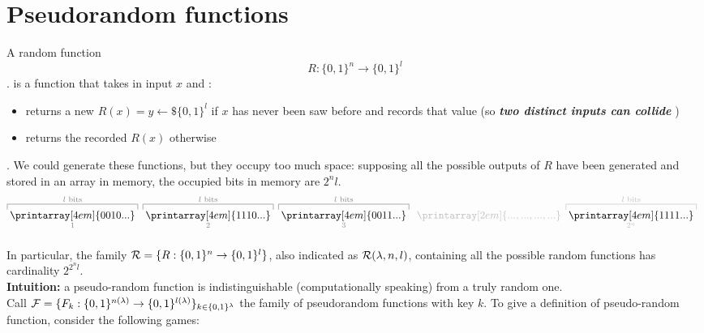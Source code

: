 \section{Pseudorandom functions}

A random function
\[  R:\{0,1\}^{n} \to \{0,1\}^{l} \].
is a function that takes in input $x$ and :
\begin{itemize}
    \item returns a new $R(x)=y \leftarrow\$ \{0,1\}^{l}$ if $x$ has never been
        saw before and records that value (so \textbf{ \textit{two distinct inputs can collide} })

    \item returns the recorded $R(x)$ otherwise
\end{itemize}.
We could generate these functions, but they occupy too much space: supposing all
the possible outputs of $R$ have been generated and stored in an array in memory, the
occupied bits in memory are $2^{n}l$.
\[  
    \color{black!50}%
    \overbracket[0.5pt][5pt]{{\thickspace}%
    \color{black}\printarray[4em]{0010...}\thickspace}^{l\textrm{ bits}}_{1}\thickspace%
    \overbracket[0.5pt][5pt]{{\thickspace}%
    \color{black}\printarray[4em]{1110...}\thickspace}^{l\textrm{ bits}}_{2}\thickspace%
    \overbracket[0.5pt][5pt]{{\thickspace}%
      \color{black}\printarray[4em]{0011...}\thickspace}^{l\textrm{ bits}}_{3}\thickspace%
    \color{black!25}\underbracket[0pt][5.5pt]{{\thickspace}%
      \printarray[2em]{...,...,...,...}\thickspace}_{}%
    \overbracket[0.5pt][5pt]{{\thickspace}%
      \color{black}\printarray[4em]{1111...}\thickspace}^{l\textrm{ bits}}_{2^{n}}\thickspace%
  \thickspace
\]

In particular, the family $\mathcal{R}=\{ R:\{0,1\}^{n} \to \{0,1\}^{l} \}$, also
indicated as $\mathcal{R}(\lambda, n, l)$,  containing
all the possible random functions has cardinality $2^{2^{n}l}$.\\

\textbf{Intuition:} a pseudo-random function is indistinguishable
(computationally speaking) from a truly random one.\\

Call $\mathcal{F}=\{ F_{k}:\{0,1\}^{n(\lambda)} \to \{0,1\}^{l(\lambda)} \}_{k \in
\{0,1\}^{\lambda}}$ the family of pseudorandom functions with key $k$. To give a
definition of pseudo-random function, consider the following games:




